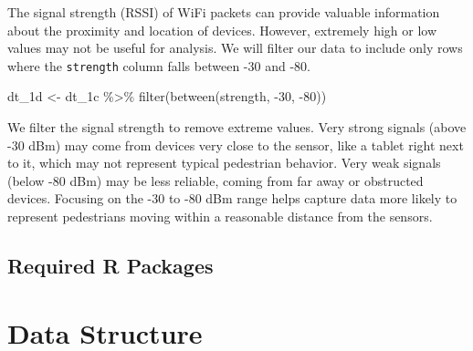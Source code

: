 \documentclass[
  letterpaper,
]{scrbook}
\newenvironment{Shaded}{\begin{snugshade}}{\end{snugshade}}
\newcommand{\DecValTok}[1]{\textcolor[rgb]{0.68,0.00,0.00}{#1}}
\newcommand{\FunctionTok}[1]{\textcolor[rgb]{0.28,0.35,0.67}{#1}}
\newcommand{\NormalTok}[1]{\textcolor[rgb]{0.00,0.23,0.31}{#1}}
\newcommand{\OtherTok}[1]{\textcolor[rgb]{0.00,0.23,0.31}{#1}}
\newcommand{\SpecialCharTok}[1]{\textcolor[rgb]{0.37,0.37,0.37}{#1}}
\begin{document}
The signal strength (RSSI) of WiFi packets can provide valuable
information about the proximity and location of devices. However,
extremely high or low values may not be useful for analysis. We will
filter our data to include only rows where the \texttt{strength} column
falls between -30 and -80.

\begin{Shaded}
\begin{Highlighting}[]
\NormalTok{dt\_1d }\OtherTok{\textless{}{-}}\NormalTok{ dt\_1c }\SpecialCharTok{\%\textgreater{}\%}
  \FunctionTok{filter}\NormalTok{(}\FunctionTok{between}\NormalTok{(strength, }\SpecialCharTok{{-}}\DecValTok{30}\NormalTok{, }\SpecialCharTok{{-}}\DecValTok{80}\NormalTok{))}
\end{Highlighting}
\end{Shaded}

\begin{tcolorbox}[enhanced jigsaw, bottomrule=.15mm, opacitybacktitle=0.6, toprule=.15mm, colback=white, colbacktitle=quarto-callout-note-color!10!white, left=2mm, colframe=quarto-callout-note-color-frame, coltitle=black, title=\textcolor{quarto-callout-note-color}{\faInfo}\hspace{0.5em}{Why We Should Filter Signal Strength}, opacityback=0, breakable, bottomtitle=1mm, toptitle=1mm, titlerule=0mm, arc=.35mm, leftrule=.75mm, rightrule=.15mm]

We filter the signal strength to remove extreme values. Very strong
signals (above -30 dBm) may come from devices very close to the sensor,
like a tablet right next to it, which may not represent typical
pedestrian behavior. Very weak signals (below -80 dBm) may be less
reliable, coming from far away or obstructed devices. Focusing on the
-30 to -80 dBm range helps capture data more likely to represent
pedestrians moving within a reasonable distance from the sensors.

\end{tcolorbox}

\hypertarget{required-r-packages-1}{%
\subsection{Required R Packages}\label{required-r-packages-1}}

\hypertarget{data-structure}{%
\section{Data Structure}\label{data-structure}}
\end{document}
